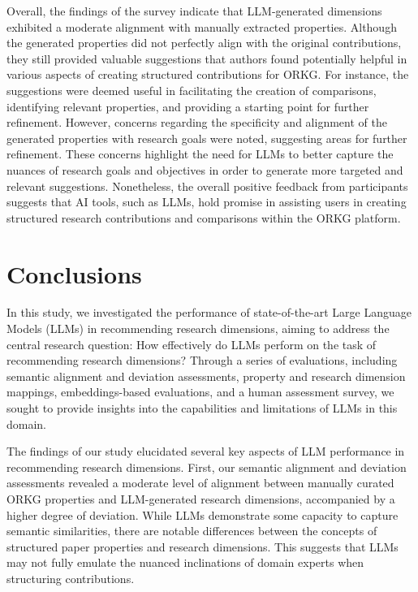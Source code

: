 Overall, the findings of the survey indicate that LLM-generated dimensions exhibited a moderate alignment with manually extracted properties. Although the generated properties did not perfectly align with the original contributions, they still provided valuable suggestions that authors found potentially helpful in various aspects of creating structured contributions for ORKG. For instance, the suggestions were deemed useful in facilitating the creation of comparisons, identifying relevant properties, and providing a starting point for further refinement. However, concerns regarding the specificity and alignment of the generated properties with research goals were noted, suggesting areas for further refinement. These concerns highlight the need for LLMs to better capture the nuances of research goals and objectives in order to generate more targeted and relevant suggestions. Nonetheless, the overall positive feedback from participants suggests that AI tools, such as LLMs, hold promise in assisting users in creating structured research contributions and comparisons within the ORKG platform.

\section{Conclusions}

In this study, we investigated the performance of state-of-the-art Large Language Models (LLMs) in recommending research dimensions, aiming to address the central research question: How effectively do LLMs perform on the task of recommending research dimensions? Through a series of evaluations, including semantic alignment and deviation assessments, property and research dimension mappings, embeddings-based evaluations, and a human assessment survey, we sought to provide insights into the capabilities and limitations of LLMs in this domain.

The findings of our study elucidated several key aspects of LLM performance in recommending research dimensions. First, our semantic alignment and deviation assessments revealed a moderate level of alignment between manually curated ORKG properties and LLM-generated research dimensions, accompanied by a higher degree of deviation. While LLMs demonstrate some capacity to capture semantic similarities, there are notable differences between the concepts of structured paper properties and research dimensions. This suggests that LLMs may not fully emulate the nuanced inclinations of domain experts when structuring contributions.

